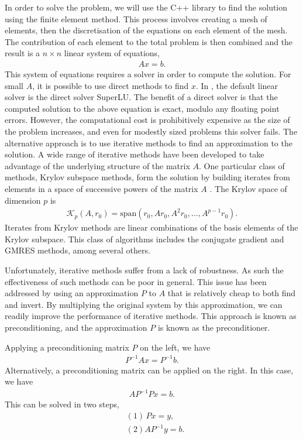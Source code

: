 

In order to solve the problem, we will use the C++ library \oomph \cite{oomph} to find the solution using the finite element method.
This process involves creating a mesh of elements, then the discretisation of the equations on each element of the mesh.
The contribution of each element to the total problem is then combined and the result is a $n\times n$ linear system of equations,
\begin{align}
	A x = b.
\end{align}
This system of equations requires a solver in order to compute the solution.
For small $A$, it is possible to use direct methods to find $x$.
In \oomph, the default linear solver is the direct solver SuperLU.
The benefit of a direct solver is that the computed solution to the above equation is exact, modulo any floating point errors.
However, the computational cost is prohibitively expensive as the size of the problem increases, and even for modestly sized problems this solver fails.
The alternative approach is to use iterative methods to find an approximation to the solution.
A wide range of iterative methods have been developed to take advantage of the underlying structure of the matrix $A$.
One particular class of methods, Krylov subspace methods, form the solution by building iterates from elements in a space of successive powers of the matrix $A$ \cite{leveque}.
The Krylov space of dimension $p$ is 
\begin{align}
	\mathcal{K}_p(A, r_0) = \mathrm{span}(r_0, Ar_0, A^2 r_0, \ldots, A^{p-1} r_0).
\end{align}
Iterates from Krylov methods are linear combinations of the basis elements of the Krylov subspace.
This class of algorithms includes the conjugate gradient and GMRES methods, among several others.


Unfortunately, iterative methods suffer from a lack of robustness.
As such the effectiveness of such methods can be poor in general.
This issue has been addressed by using an approximation $P$ to $A$ that is relatively cheap to both find and invert.
By multiplying the original system by this approximation, we can readily improve the performance of iterative methods.
This approach is known as preconditioning, and the approximation $P$ is known as the preconditioner.

Applying a preconditioning matrix $P$ on the left, we have
\begin{align}
	P^{-1} A x = P^{-1} b. \label{eqn:precond_left}
\end{align}
Alternatively, a preconditioning matrix can be applied on the right.
In this case, we have
\begin{align}
	A P^{-1} P x = b. \label{eqn:precond_right}
\end{align}
This can be solved in two steps, 
\begin{align}
	&(1) \, P x = y, \\ &(2) A P^{-1} y = b.
\end{align}

